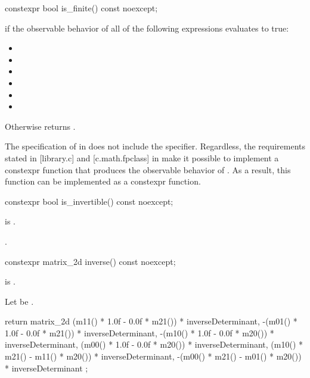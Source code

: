 %
\begin{itemdecl}
constexpr bool is_finite() const noexcept;
\end{itemdecl}
\begin{itemdescr}
\pnum
\returns
{} if the observable behavior of all of the following expressions evaluates to true:
\begin{itemize}
\item {}
\item {}
\item {}
\item {}
\item {}
\item {}
\end{itemize}

\pnum
Otherwise returns .

\pnum
\begin{note}
The specification of  in \cppseventeen does not include the  specifier. Regardless, the requirements stated in [library.c] and [c.math.fpclass] in \cppseventeen make it possible to implement a constexpr function that produces the observable behavior of . As a result, this function can be implemented as a constexpr function.
\end{note}
\end{itemdescr}

%
\begin{itemdecl}
constexpr bool is_invertible() const noexcept;
\end{itemdecl}
\begin{itemdescr}
\pnum
\requires
{} is .

\pnum
\returns
{}.
\end{itemdescr}

%
\begin{itemdecl}
constexpr matrix_2d inverse() const noexcept;
\end{itemdecl}
\begin{itemdescr}
\pnum
\requires
{} is .

\pnum
\returns
Let  be .

\begin{codeblock}
return matrix_2d{
   (m11() * 1.0f - 0.0f * m21()) * inverseDeterminant,
  -(m01() * 1.0f - 0.0f * m21()) * inverseDeterminant,
  -(m10() * 1.0f - 0.0f * m20()) * inverseDeterminant,
   (m00() * 1.0f - 0.0f * m20()) * inverseDeterminant,
   (m10() * m21() - m11() * m20()) * inverseDeterminant,
  -(m00() * m21() - m01() * m20()) * inverseDeterminant
};
\end{codeblock}
\end{itemdescr}

